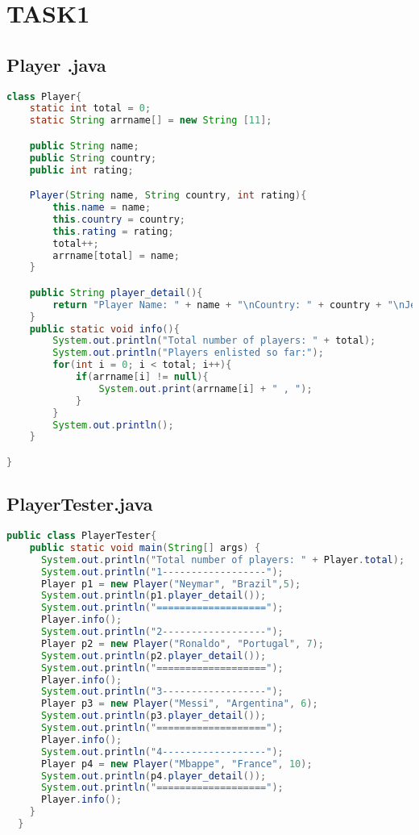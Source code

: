 \documentclass[11pt,a4paper]{article}
\begin{document}
\clearpage
\section*{TASK1}

\subsection*{Player .java}
\begin{lstlisting}[style=codestyle,language=Java]
class Player{
    static int total = 0;
    static String arrname[] = new String [11];

    public String name;
    public String country;
    public int rating;

    Player(String name, String country, int rating){
        this.name = name;
        this.country = country;
        this.rating = rating;
        total++;
        arrname[total] = name;
    }

    public String player_detail(){
        return "Player Name: " + name + "\nCountry: " + country + "\nJersey Number: " + rating;
    }
    public static void info(){
        System.out.println("Total number of players: " + total);
        System.out.println("Players enlisted so far:");
        for(int i = 0; i < total; i++){
            if(arrname[i] != null){
                System.out.print(arrname[i] + " , ");
            }
        }
        System.out.println();
    }

}
\end{lstlisting}

\subsection*{PlayerTester.java}
\begin{lstlisting}[style=codestyle,language=Java]
public class PlayerTester{
    public static void main(String[] args) {
      System.out.println("Total number of players: " + Player.total);
      System.out.println("1------------------");
      Player p1 = new Player("Neymar", "Brazil",5);
      System.out.println(p1.player_detail());
      System.out.println("===================");
      Player.info();
      System.out.println("2------------------");
      Player p2 = new Player("Ronaldo", "Portugal", 7);
      System.out.println(p2.player_detail());
      System.out.println("===================");
      Player.info();
      System.out.println("3------------------");
      Player p3 = new Player("Messi", "Argentina", 6);
      System.out.println(p3.player_detail());
      System.out.println("===================");
      Player.info();
      System.out.println("4------------------");
      Player p4 = new Player("Mbappe", "France", 10);
      System.out.println(p4.player_detail());
      System.out.println("===================");
      Player.info();
    }
  }
\end{lstlisting}
\end{document}

